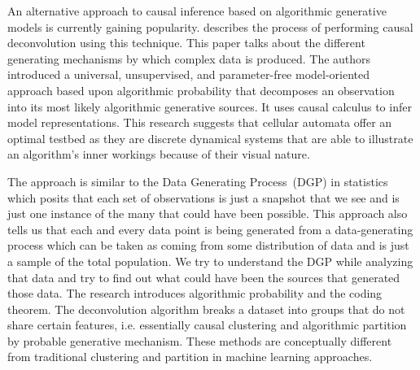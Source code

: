 \documentclass[%
 aps,
 jmp,%
 amsmath,amssymb,
 reprint,%
]{revtex4-2}
\begin{document}
An alternative approach to causal inference based on algorithmic generative models is currently gaining popularity. 
\cite{zenil2019causal} describes the process of performing causal deconvolution using this technique.
This paper talks about the different generating mechanisms by which complex data is produced. 
The authors introduced a universal, unsupervised, and parameter-free model-oriented approach based upon algorithmic probability that decomposes an observation into its most likely algorithmic generative sources. 
It uses causal calculus to infer model representations. 
This research suggests that cellular automata offer an optimal testbed as they are discrete dynamical systems that are able to illustrate an algorithm's inner workings because of their visual nature. 

The approach is similar to the Data Generating Process~(DGP) in statistics which posits that each set of observations is just a snapshot that we see and is just one instance of the many that could have been possible. 
This approach also tells us that each and every data point is being generated from a data-generating process which can be taken as coming from some distribution of data and is just a sample of the total population. 
We try to understand the DGP while analyzing that data and try to find out what could have been the sources that generated those data.
The research introduces algorithmic probability and the coding theorem. 
The deconvolution algorithm breaks a dataset into groups that do not share certain features, i.e. essentially causal clustering and algorithmic partition by probable generative mechanism.
These methods are conceptually different from traditional clustering and partition in machine learning approaches.
\end{document}
